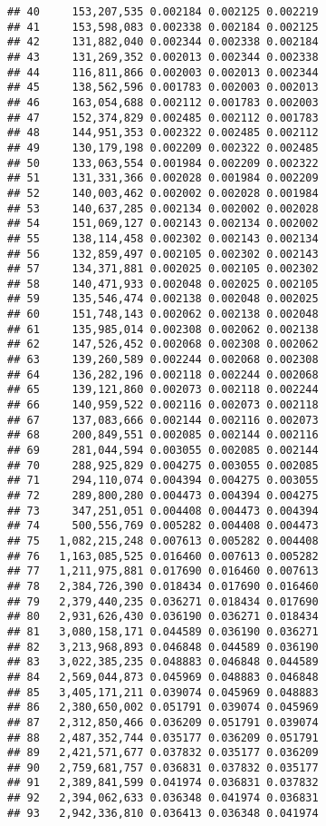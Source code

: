 \documentclass[]{article}
\begin{document}
\begin{verbatim}
## 40     153,207,535 0.002184 0.002125 0.002219
## 41     153,598,083 0.002338 0.002184 0.002125
## 42     131,882,040 0.002344 0.002338 0.002184
## 43     131,269,352 0.002013 0.002344 0.002338
## 44     116,811,866 0.002003 0.002013 0.002344
## 45     138,562,596 0.001783 0.002003 0.002013
## 46     163,054,688 0.002112 0.001783 0.002003
## 47     152,374,829 0.002485 0.002112 0.001783
## 48     144,951,353 0.002322 0.002485 0.002112
## 49     130,179,198 0.002209 0.002322 0.002485
## 50     133,063,554 0.001984 0.002209 0.002322
## 51     131,331,366 0.002028 0.001984 0.002209
## 52     140,003,462 0.002002 0.002028 0.001984
## 53     140,637,285 0.002134 0.002002 0.002028
## 54     151,069,127 0.002143 0.002134 0.002002
## 55     138,114,458 0.002302 0.002143 0.002134
## 56     132,859,497 0.002105 0.002302 0.002143
## 57     134,371,881 0.002025 0.002105 0.002302
## 58     140,471,933 0.002048 0.002025 0.002105
## 59     135,546,474 0.002138 0.002048 0.002025
## 60     151,748,143 0.002062 0.002138 0.002048
## 61     135,985,014 0.002308 0.002062 0.002138
## 62     147,526,452 0.002068 0.002308 0.002062
## 63     139,260,589 0.002244 0.002068 0.002308
## 64     136,282,196 0.002118 0.002244 0.002068
## 65     139,121,860 0.002073 0.002118 0.002244
## 66     140,959,522 0.002116 0.002073 0.002118
## 67     137,083,666 0.002144 0.002116 0.002073
## 68     200,849,551 0.002085 0.002144 0.002116
## 69     281,044,594 0.003055 0.002085 0.002144
## 70     288,925,829 0.004275 0.003055 0.002085
## 71     294,110,074 0.004394 0.004275 0.003055
## 72     289,800,280 0.004473 0.004394 0.004275
## 73     347,251,051 0.004408 0.004473 0.004394
## 74     500,556,769 0.005282 0.004408 0.004473
## 75   1,082,215,248 0.007613 0.005282 0.004408
## 76   1,163,085,525 0.016460 0.007613 0.005282
## 77   1,211,975,881 0.017690 0.016460 0.007613
## 78   2,384,726,390 0.018434 0.017690 0.016460
## 79   2,379,440,235 0.036271 0.018434 0.017690
## 80   2,931,626,430 0.036190 0.036271 0.018434
## 81   3,080,158,171 0.044589 0.036190 0.036271
## 82   3,213,968,893 0.046848 0.044589 0.036190
## 83   3,022,385,235 0.048883 0.046848 0.044589
## 84   2,569,044,873 0.045969 0.048883 0.046848
## 85   3,405,171,211 0.039074 0.045969 0.048883
## 86   2,380,650,002 0.051791 0.039074 0.045969
## 87   2,312,850,466 0.036209 0.051791 0.039074
## 88   2,487,352,744 0.035177 0.036209 0.051791
## 89   2,421,571,677 0.037832 0.035177 0.036209
## 90   2,759,681,757 0.036831 0.037832 0.035177
## 91   2,389,841,599 0.041974 0.036831 0.037832
## 92   2,394,062,633 0.036348 0.041974 0.036831
## 93   2,942,336,810 0.036413 0.036348 0.041974

\end{verbatim}
\end{document}
